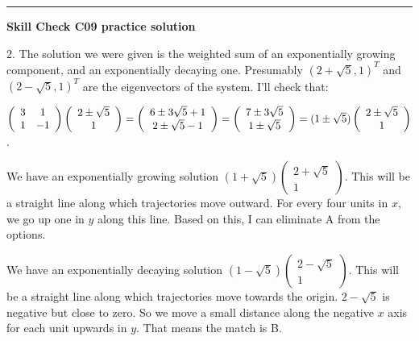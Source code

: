 \documentclass[12pt,letterpaper,noanswers]{exam}
\begin{document}
\vspace{0.2cm}

\hrule
\vspace{0.2cm}

\noindent\textbf{Skill Check C09 practice solution}

2. The solution we were given is the weighted sum of an exponentially growing component, and an exponentially decaying one.  Presumably $(2+\sqrt{5},1)^T$ and $(2-\sqrt{5}, 1)^T$ are the eigenvectors of the system.  I'll check that:

$\left(\begin{array}{c c} 3 & 1 \\ 1  & -1 \end{array}\right)\left(\begin{array}{c} 2\pm\sqrt{5} \\ 1 \end{array}\right) = \left(\begin{array}{c} 6 \pm 3\sqrt{5} + 1 \\ 2\pm \sqrt{5} - 1\end{array}\right) = \left(\begin{array}{c} 7 \pm 3\sqrt{5} \\ 1\pm \sqrt{5} \end{array}\right) = (1\pm\sqrt{5})\left(\begin{array}{c} 2\pm\sqrt{5} \\ 1 \end{array}\right)$.

We have an exponentially growing solution $(1+\sqrt{5})\left(\begin{array}{c}2 + \sqrt{5} \\ 1\end{array}\right)$.  This will be a straight line along which trajectories move outward.  For every four units in $x$, we go up one in $y$ along this line.  Based on this, I can eliminate A from the options.

We have an exponentially decaying solution $(1-\sqrt{5})\left(\begin{array}{c}2 - \sqrt{5} \\ 1\end{array}\right)$.  This will be a straight line along which trajectories move towards the origin.  $2 - \sqrt{5}$ is negative but close to zero.  So we move a small distance along the negative $x$ axis for each unit upwards in $y$.  That means the match is B.

\vspace{0.2cm}
\end{document}
